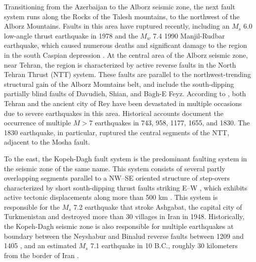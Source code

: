 Transitioning from the Azerbaijan to the Alborz seismic zone, the next fault system runs along the Rocks of the Talesh mountains, to the northwest of the Alborz Mountains. Faults in this area have ruptured recently, including an $M_s$ 6.0 low-angle thrust earthquake in 1978 \citep{Berberian1999} and the $M_w$ 7.4 1990 Manjil-Rudbar earthquake, which caused numerous deaths and significant damage to the region in the south Caspian depression \citep{USGS_manjil}. At the central area of the Alborz seismic zone, near Tehran, the region is characterized by active reverse faults in the North Tehran Thrust (NTT) system. These faults are parallel to the northwest-trending structural gain of the Alborz Mountains belt, and include the south-dipping partially blind faults of Davudieh, Shian, and Bagh-E Feyz. According to \citet{Ambraseys2005}, both Tehran and the ancient city of Rey have been devastated in multiple occasions due to severe earthquakes in this area. Historical accounts document the occurrence of multiple $M>7$ earthquakes in 743, 958, 1177, 1655, and 1830. The 1830 earthquake, in particular, ruptured the central segments of the NTT, adjacent to the Mosha fault.

To the east, the Kopeh-Dagh fault system is the predominant faulting system in the seismic zone of the same name. This system consists of several partly overlapping segments parallel to a NW--SE oriented structure of step-overs characterized by short south-dipping thrust faults striking E--W \citep{Berberian2001}, which exhibits active tectonic displacements along more than 500 km \citep{Trifonov1978}. This system is responsible for the $M_s$ 7.2 earthquake that stroke Ashgabat, the capital city of Turkmenistan and destroyed more than 30 villages in Iran in 1948. Historically, the Kopeh-Dagh seismic zone is also responsible for multiple earthquakes at boundary between the Neyshabur and Binalud reverse faults between 1209 and 1405 \citep{Berberian1999}, and an estimated $M_s$ 7.1 earthquake in 10 B.C., roughly 30 kilometers from the border of Iran \citep{Berberian2001}.




